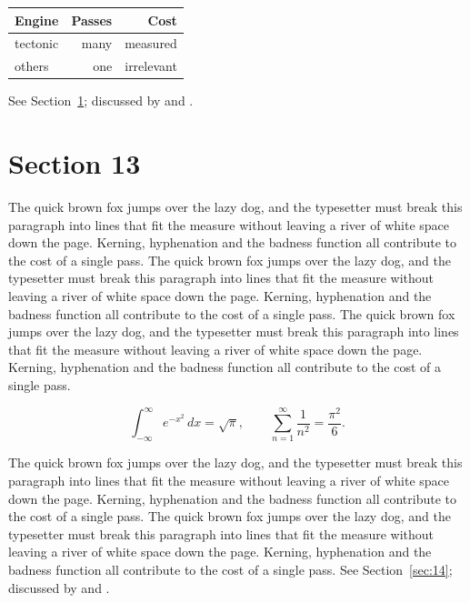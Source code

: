 \documentclass{article}
\begin{document}
\begin{center}
\begin{tabular}{lrr}
\toprule
Engine & Passes & Cost \\
\midrule
tectonic & many & measured \\
others & one & irrelevant \\
\bottomrule
\end{tabular}
\end{center}

See Section~\ref{sec:13}; discussed by \textcite{k3} and \textcite{l5}.
\section{Section 13}
\label{sec:13}
The quick brown fox jumps over the lazy dog, and the typesetter must break this paragraph into lines that fit the measure without leaving a river of white space down the page. Kerning, hyphenation and the badness function all contribute to the cost of a single pass. The quick brown fox jumps over the lazy dog, and the typesetter must break this paragraph into lines that fit the measure without leaving a river of white space down the page. Kerning, hyphenation and the badness function all contribute to the cost of a single pass. The quick brown fox jumps over the lazy dog, and the typesetter must break this paragraph into lines that fit the measure without leaving a river of white space down the page. Kerning, hyphenation and the badness function all contribute to the cost of a single pass. 

\begin{equation}\label{eq:13}
\int_{-\infty}^{\infty} e^{-x^{2}}\,dx = \sqrt{\pi}, \qquad
\sum_{n=1}^{\infty} \frac{1}{n^{2}} = \frac{\pi^{2}}{6}.
\end{equation}

The quick brown fox jumps over the lazy dog, and the typesetter must break this paragraph into lines that fit the measure without leaving a river of white space down the page. Kerning, hyphenation and the badness function all contribute to the cost of a single pass. The quick brown fox jumps over the lazy dog, and the typesetter must break this paragraph into lines that fit the measure without leaving a river of white space down the page. Kerning, hyphenation and the badness function all contribute to the cost of a single pass. 
See Section~\ref{sec:14}; discussed by \textcite{k4} and \textcite{l1}.
\end{document}
